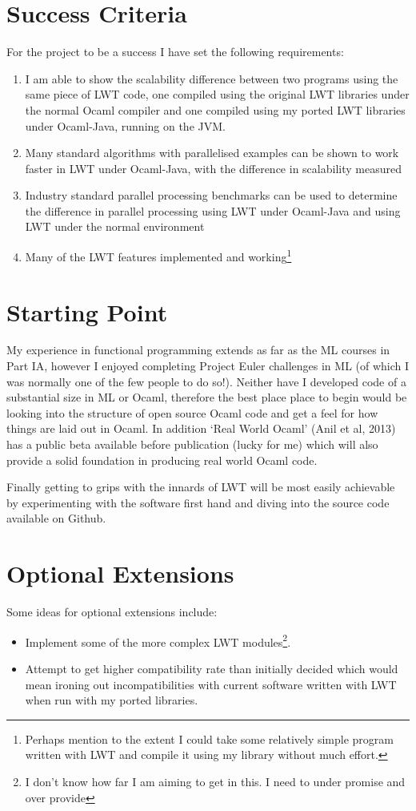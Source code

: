 \documentclass[a4paper]{article}
\begin{document}
\section{Success Criteria}
\label{sec:success}
For the project to be a success I have set the following requirements:
\begin{enumerate}
\item{I am able to show the scalability difference between two programs using the same piece of LWT code, one compiled using the original LWT libraries under the normal Ocaml compiler and one compiled using my ported LWT libraries under Ocaml-Java, running on the JVM.}
\item{Many standard algorithms with parallelised examples can be shown to work faster in LWT under Ocaml-Java, with the difference in scalability measured}
\item{Industry standard parallel processing benchmarks can be used to determine the difference in parallel processing using LWT under Ocaml-Java and using LWT under the normal environment}
\item{Many of the LWT features implemented and working\footnote{Perhaps mention to the extent I could take some relatively simple program written with LWT and compile it using my library without much effort.}}
\end{enumerate}

\section{Starting Point}
\label{sec:starting}
My experience in functional programming extends as far as the ML courses in Part IA, however I enjoyed completing Project Euler challenges in ML (of which I was normally one of the few people to do so!). Neither have I developed code of a substantial size in ML or Ocaml, therefore the best place place to begin would be looking into the structure of open source Ocaml code and get a feel for how things are laid out in Ocaml. In addition `Real World Ocaml' (Anil et al, 2013) has a public beta available before publication (lucky for me) which will also provide a solid foundation in producing real world Ocaml code.

Finally getting to grips with the innards of LWT will be most easily achievable by experimenting with the software first hand and diving into the source code available on Github.

\section{Optional Extensions}
\label{sec:optional}
Some ideas for optional extensions include:
\begin{itemize}
\item{Implement some of the more complex LWT modules\footnote{I don't know how far I am aiming to get in this. I need to under promise and over provide}.}
\item{Attempt to get higher compatibility rate than initially decided which would mean ironing out incompatibilities with current software written with LWT when run with my ported libraries.}
\end{itemize}
\end{document}
